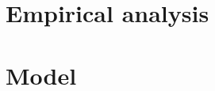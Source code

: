 \documentclass{article}
\begin{document}











\section{Empirical analysis}





\section{Model}
\end{document}
